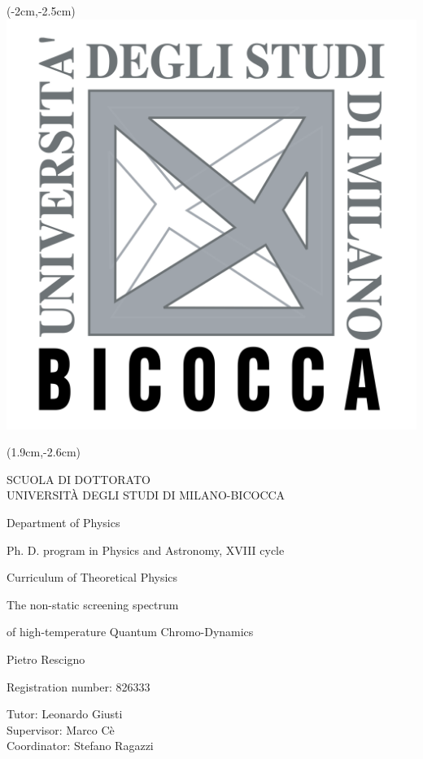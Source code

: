 \documentclass{report}
\begin{document}

\thispagestyle{empty}
\begin{textblock*}{\textwidth}(-2cm,-2.5cm)
\includegraphics[height=0.1\paperheight]{logos/Bicocca_transparent.png}	
\end{textblock*}
\begin{textblock*}{\textwidth}(1.9cm,-2.6cm)
\begin{flushleft}
{\color{red}\Large{SCUOLA DI DOTTORATO}}\\[2mm]
{\color{red}\large{UNIVERSIT\`A DEGLI STUDI DI MILANO-BICOCCA}}
\end{flushleft}
\end{textblock*}
\vspace{2cm}
\centerline{\Large{Department of Physics }}
\vspace{0.5cm}
\centerline{\Large{Ph. D. program in Physics and Astronomy, XVIII cycle}}
\vspace{2mm}
\centerline{\Large{Curriculum of Theoretical Physics}}
\vspace{2cm}
\centerline{\huge{ The non-static screening spectrum}}
\centerline{\huge{of high-temperature Quantum Chromo-Dynamics}}
\vspace{2cm}
\centerline{\LARGE{Pietro Rescigno}}
\vspace{2mm}
\centerline{\Large{Registration number: 826333}}
\vspace{2cm}
\begin{flushleft}
\LARGE{Tutor: Leonardo Giusti}\\[1.5mm]
\LARGE{Supervisor: Marco Cè}\\[3cm]
\LARGE{Coordinator: Stefano Ragazzi}
\end{flushleft}
\vfill
\end{document}
